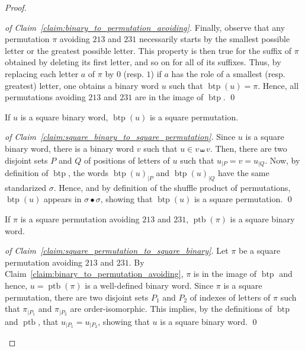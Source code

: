 \documentclass[a4paper]{llncs}
\DeclareMathOperator{\SHUFFLE}{\bullet}
\DeclareMathOperator{\BINTOPERM}{\mathrm{btp}}
\DeclareMathOperator{\PERMTOBIN}{\mathrm{ptb}}
\begin{document}
\begin{proof}
\begin{proof}[of Claim~\ref{claim:binary_to_permutation_avoiding}]
        Finally, observe that any permutation $\pi$ avoiding $213$ and
        $231$ necessarily starts by the smallest possible letter or the
        greatest possible letter. This property is then true for the
        suffix of $\pi$ obtained by deleting its first letter,
        and so on for all of its suffixes. Thus, by
        replacing each letter $a$ of $\pi$ by $0$ (resp. $1$) if $a$ has the
        role of a smallest (resp. greatest) letter, one obtains a binary
        word $u$ such that $\BINTOPERM(u) = \pi$. Hence, all permutations
        avoiding $213$ and $231$ are in the image of $\BINTOPERM$.
        \qed
    \end{proof}
    \begin{claim} \label{claim:square_binary_to_square_permutation}
        If $u$ is a square binary word, $\BINTOPERM(u)$ is a square
        permutation.
    \end{claim}
    \begin{proof}[of Claim~\ref{claim:square_binary_to_square_permutation}]
        Since $u$ is a square binary word, there is a binary word $v$
        such that $u \in v \shuffle v$. Then, there are two disjoint
        sets $P$ and $Q$ of positions of letters of $u$ such that
        $u_{|P} = v = u_{|Q}$. Now, by definition of $\BINTOPERM$, the
        words $\BINTOPERM(u)_{|P}$ and $\BINTOPERM(u)_{|Q}$ have the
        same standarized $\sigma$. Hence, and by definition of
        the shuffle product of permutations, $\BINTOPERM(u)$ appears in
        $\sigma \SHUFFLE \sigma$, showing that $\BINTOPERM(u)$ is a
        square permutation.
        \qed
    \end{proof}
    \begin{claim} \label{claim:square_permutation_to_square_binary}
        If $\pi$ is a square permutation avoiding $213$ and $231$,
        $\PERMTOBIN(\pi)$ is a square binary word.
    \end{claim}
    \begin{proof}[of Claim~\ref{claim:square_permutation_to_square_binary}]
        Let $\pi$ be a square permutation avoiding $213$ and $231$. By
        Claim~\ref{claim:binary_to_permutation_avoiding}, $\pi$ is in
        the image of $\BINTOPERM$ and hence, $u = \PERMTOBIN(\pi)$ is a
        well-defined binary word. Since $\pi$ is a square permutation,
        there are two disjoint sets $P_1$ and $P_2$ of indexes of letters
        of $\pi$ such that $\pi_{|P_1}$ and $\pi_{|P_2}$ are
        order-isomorphic. This implies, by the definitions of $\BINTOPERM$
        and $\PERMTOBIN$, that $u_{|P_1} = u_{|P_2}$, showing that $u$
        is a square binary word.
        \qed
    \end{proof}
\end{proof}
\medskip
\end{document}

